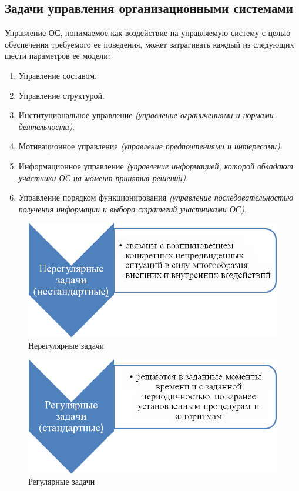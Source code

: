 \documentclass[a4paper,12pt,oneside,final]{extarticle}
\makeatletter
\numberwithin{equation}{section}
\def\maxwidth#1{\ifdim\Gin@nat@width>#1 #1\else\Gin@nat@width\fi}
\makeatother
\begin{document}
\subsection{Задачи управления организационными системами}
Управление ОС, понимаемое как воздействие на управляемую систему с целью обеспечения требуемого ее поведения, может затрагивать каждый из следующих шести параметров ее модели:
\begin{enumerate}
	\item Управление составом.
	\item Управление структурой.
	\item Институциональное управление \textit{(управление ограничениями и нормами деятельности)}.
	\item Мотивационное управление \textit{(управление предпочте­ниями и интересами)}.
	\item Информационное управление \textit{(управление информацией, ко­торой обладают участники ОС на момент принятия решений)}.
	\item Управление порядком функционирования \textit{(управление последовательностью получения информации и выбора стратегий участниками ОС)}.
\end{enumerate}
\begin{figure}[h]
	\centering
	\includegraphics[width=\maxwidth{\textwidth}]{management-figures/non_regular_organization_management_tasks}
	\caption{Нерегулярные задачи}
\end{figure}
\begin{figure}[h]
	\centering
	\includegraphics[width=\maxwidth{\textwidth}]{management-figures/regular_organization_management_tasks}
	\caption{Регулярные задачи}
\end{figure}
\end{document}
